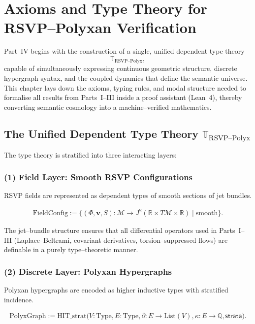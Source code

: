 \chapter{Axioms and Type Theory for RSVP--Polyxan Verification}
\label{ch:axioms-type-theory}

Part~IV begins with the construction of a single, unified dependent type theory
\[
\mathbb{T}_{\mathrm{RSVP\text{--}Polyx}},
\]
capable of simultaneously expressing continuous geometric structure,
discrete hypergraph syntax,
and the coupled dynamics that define the semantic universe.
This chapter lays down the axioms, typing rules, and modal structure
needed to formalise all results from Parts~I--III inside a proof assistant
(Lean~4), thereby converting semantic cosmology into a machine--verified mathematics.

\section{The Unified Dependent Type Theory $\mathbb{T}_{\mathrm{RSVP\text{--}Polyx}}$}

The type theory is stratified into three interacting layers:

\subsection{(1) Field Layer: Smooth RSVP Configurations}

RSVP fields are represented as dependent types of smooth sections of jet bundles.

\begin{align}
\mathrm{FieldConfig} 
  := \{ (\Phi,\mathbf{v},S) : \mathcal{M}\to J^2(\mathbb{R}\times T\mathcal{M}\times\mathbb{R}) 
      \mid \text{smooth} \}.
\end{align}

The jet--bundle structure ensures that all differential operators used in Parts~I--III
(Laplace--Beltrami, covariant derivatives, torsion--suppressed flows)
are definable in a purely type--theoretic manner.

\subsection{(2) Discrete Layer: Polyxan Hypergraphs}

Polyxan hypergraphs are encoded as higher inductive types with stratified incidence.

\begin{align}
\mathrm{PolyxGraph}
  := \mathrm{HIT}\_{\text{strat}}
     \big(
       V : \mathrm{Type},
       E : \mathrm{Type},
       \partial : E\to\mathrm{List}(V),
       \kappa : E\to\mathbb{Q},
       \mathsf{strata}
     \big).
\end{align}

